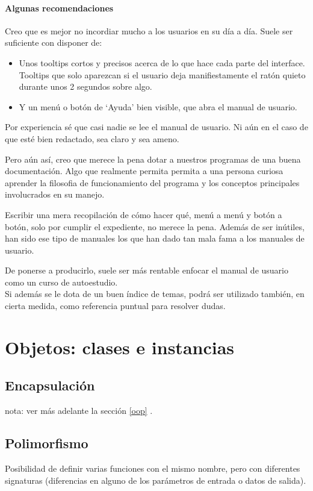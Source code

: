 \documentclass[spanish,12pt,a4paper,final,oneside]{book}
\begin{document}
\subsubsection*{Algunas recomendaciones}
Creo que es mejor no incordiar mucho a los usuarios en su día a día. Suele ser suficiente con disponer de:
\begin{itemize}
\item Unos tooltips cortos y precisos acerca de lo que hace cada parte del interface. Tooltips que solo aparezcan si el usuario deja manifiestamente el ratón quieto durante unos 2 segundos sobre algo. 
\item Y un menú o botón de `Ayuda' bien visible, que abra el manual de usuario.
\end{itemize}

Por experiencia sé que casi nadie se lee el manual de usuario. Ni aún en el caso de que esté bien redactado, sea claro y sea ameno.

Pero aún así, creo que merece la pena dotar a nuestros programas de una buena documentación. Algo que realmente permita permita a una persona curiosa aprender la filosofia de funcionamiento del programa y los conceptos principales involucrados en su manejo.

Escribir una mera recopilación de cómo hacer qué, menú a menú y botón a botón, solo por cumplir el expediente, no merece la pena. Además de ser inútiles, han sido ese tipo de manuales los que han dado tan mala fama a los manuales de usuario.

De ponerse a producirlo, suele ser más rentable enfocar el manual de usuario como un curso de autoestudio.
\\Si además se le dota de un buen índice de temas, podrá ser utilizado también, en cierta medida, como referencia puntual para resolver dudas.






\chapter{Objetos: clases e instancias}

\section{Encapsulación}
nota: ver más adelante la sección \ref{oop} .

\section{Polimorfismo}
Posibilidad de definir varias funciones con el mismo nombre, pero con diferentes signaturas (diferencias en alguno de los parámetros de entrada o datos de salida).
\end{document}
